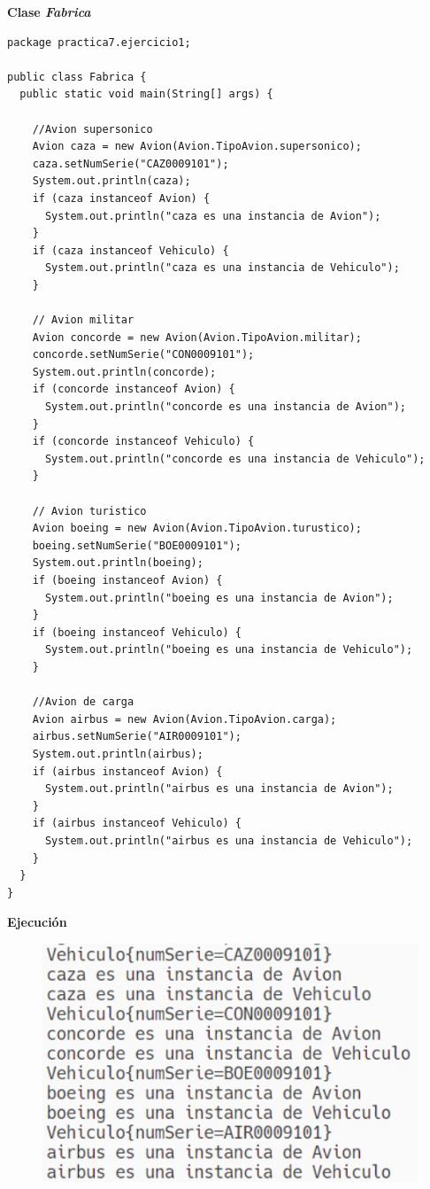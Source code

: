 \documentclass[11pt, twocolumn]{article}
\begin{document}
  \textbf{Clase \textit{Fabrica}}
  \begin{lstlisting}
package practica7.ejercicio1;

public class Fabrica {
  public static void main(String[] args) {
      
    //Avion supersonico
    Avion caza = new Avion(Avion.TipoAvion.supersonico);
    caza.setNumSerie("CAZ0009101");
    System.out.println(caza);
    if (caza instanceof Avion) {
      System.out.println("caza es una instancia de Avion");
    }
    if (caza instanceof Vehiculo) {
      System.out.println("caza es una instancia de Vehiculo");
    }

    // Avion militar
    Avion concorde = new Avion(Avion.TipoAvion.militar);
    concorde.setNumSerie("CON0009101");
    System.out.println(concorde);
    if (concorde instanceof Avion) {
      System.out.println("concorde es una instancia de Avion");
    }
    if (concorde instanceof Vehiculo) {
      System.out.println("concorde es una instancia de Vehiculo");
    }

    // Avion turistico
    Avion boeing = new Avion(Avion.TipoAvion.turustico);
    boeing.setNumSerie("BOE0009101");
    System.out.println(boeing);
    if (boeing instanceof Avion) {
      System.out.println("boeing es una instancia de Avion");
    }
    if (boeing instanceof Vehiculo) {
      System.out.println("boeing es una instancia de Vehiculo");
    }

    //Avion de carga
    Avion airbus = new Avion(Avion.TipoAvion.carga);
    airbus.setNumSerie("AIR0009101");
    System.out.println(airbus);
    if (airbus instanceof Avion) {
      System.out.println("airbus es una instancia de Avion");
    }
    if (airbus instanceof Vehiculo) {
      System.out.println("airbus es una instancia de Vehiculo");
    }   
  }
}
  \end{lstlisting}
  
  \textbf{Ejecución}
  \begin{figure}[ht]
    \includegraphics[width=0.6\columnwidth, center]{P1.png}
  \end{figure}
\end{document}
